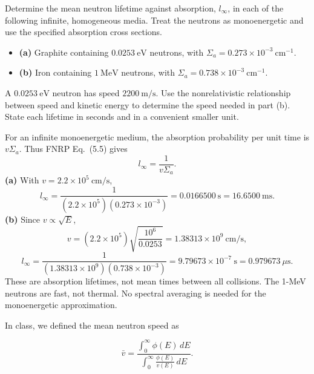 


Determine the mean neutron lifetime against absorption, \(l_\infty\), in
each of the following infinite, homogeneous media. Treat the neutrons as
monoenergetic and use the specified absorption cross sections.

\begin{itemize}
\setlength{\itemsep}{0pt}\setlength{\parskip}{0pt}
\item
  \textbf{(a)} Graphite containing \(0.0253~\mathrm{eV}\) neutrons, with
  \(\Sigma_a=0.273\times10^{-3}~\mathrm{cm^{-1}}\).
\item
  \textbf{(b)} Iron containing \(1~\mathrm{MeV}\) neutrons, with
  \(\Sigma_a=0.738\times10^{-3}~\mathrm{cm^{-1}}\).
\end{itemize}

A \(0.0253~\mathrm{eV}\) neutron has speed \(2200~\mathrm{m/s}\). Use
the nonrelativistic relationship between speed and kinetic energy to
determine the speed needed in part (b). State each lifetime in seconds
and in a convenient smaller unit.


\begin{adaptedsolution}
For an infinite monoenergetic medium, the absorption probability per unit time is $v\Sigma_a$. Thus FNRP Eq.~(5.5) gives
\[
l_\infty=\frac{1}{v\Sigma_a}.
\]
\textbf{(a)} With $v=2.2\times10^5~\mathrm{cm/s}$,
\[
\boxed{l_\infty=\frac{1}{(2.2\times10^5)(0.273\times10^{-3})}
=0.0166500~\mathrm{s}=16.6500~\mathrm{ms}.}
\]
\textbf{(b)} Since $v\propto\sqrt E$,
\[
v=(2.2\times10^5)\sqrt{\frac{10^6}{0.0253}}
=1.38313\times10^9~\mathrm{cm/s},
\]
\[
\boxed{l_\infty=\frac{1}{(1.38313\times10^9)(0.738\times10^{-3})}
=9.79673\times10^{-7}~\mathrm{s}=0.979673~\mu\mathrm{s}.}
\]
These are absorption lifetimes, not mean times between all collisions. The 1-MeV neutrons are fast, not thermal. No spectral averaging is needed for the monoenergetic approximation.
\end{adaptedsolution}

\newpage


In class, we defined the mean neutron speed as

\[
\bar v=
\frac{\displaystyle\int_0^\infty\phi(E)\,dE}
     {\displaystyle\int_0^\infty\frac{\phi(E)}{v(E)}\,dE}.
\]

